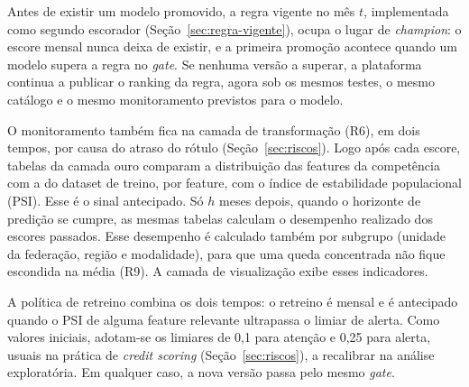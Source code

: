Antes de existir um modelo promovido, a regra vigente no mês $t$, implementada como segundo escorador (Seção~\ref{sec:regra-vigente}), ocupa o lugar de \textit{champion}: o escore mensal nunca deixa de existir, e a primeira promoção acontece quando um modelo supera a regra no \textit{gate}. Se nenhuma versão a superar, a plataforma continua a publicar o ranking da regra, agora sob os mesmos testes, o mesmo catálogo e o mesmo monitoramento previstos para o modelo.

O monitoramento também fica na camada de transformação (R6), em dois tempos, por causa do atraso do rótulo (Seção~\ref{sec:riscos}). Logo após cada escore, tabelas da camada ouro comparam a distribuição das features da competência com a do dataset de treino, por feature, com o índice de estabilidade populacional (PSI). Esse é o sinal antecipado. Só $h$ meses depois, quando o horizonte de predição se cumpre, as mesmas tabelas calculam o desempenho realizado dos escores passados. Esse desempenho é calculado também por subgrupo (unidade da federação, região e modalidade), para que uma queda concentrada não fique escondida na média (R9). A camada de visualização exibe esses indicadores.

A política de retreino combina os dois tempos: o retreino é mensal e é antecipado quando o PSI de alguma feature relevante ultrapassa o limiar de alerta. Como valores iniciais, adotam-se os limiares de 0,1 para atenção e 0,25 para alerta, usuais na prática de \textit{credit scoring} \cite{siddiqi2006} (Seção~\ref{sec:riscos}), a recalibrar na análise exploratória. Em qualquer caso, a nova versão passa pelo mesmo \textit{gate}.

